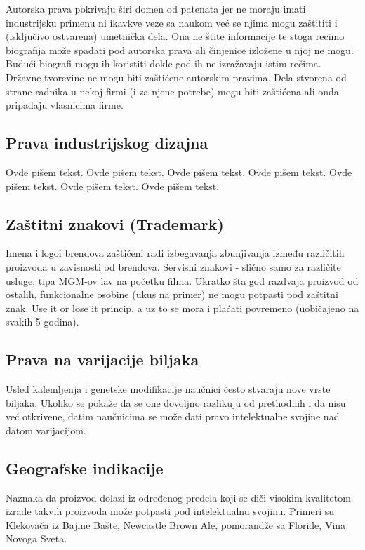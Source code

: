 \documentclass[a4paper]{article}
\begin{document}
Autorska prava pokrivaju širi domen od patenata jer ne moraju imati industrijsku primenu ni ikavkve veze sa naukom već se njima mogu zaštititi i (isključivo ostvarena) umetnička dela. Ona ne štite informacije te stoga recimo biografija može spadati pod autorska prava ali činjenice izložene u njoj ne mogu. Budući biografi mogu ih koristiti dokle god ih ne izražavaju istim rečima. Državne tvorevine ne mogu biti zaštićene autorskim pravima. Dela stvorena od strane radnika u nekoj firmi (i za njene potrebe) mogu biti zaštićena ali onda pripadaju vlasnicima firme.

\subsection{Prava industrijskog dizajna}
\label{subsec:dizajn}

Ovde pišem tekst. 
Ovde pišem tekst. 
Ovde pišem tekst. 
Ovde pišem tekst. 
Ovde pišem tekst. 
Ovde pišem tekst. 
Ovde pišem tekst. 

\subsection{Zaštitni znakovi (Trademark)}
\label{subsec:trademark}

Imena i logoi brendova zaštićeni radi izbegavanja zbunjivanja između različitih proizvoda u zavisnosti od brendova. Servisni
znakovi - slično samo za različite usluge, tipa MGM-ov lav na početku filma.
Ukratko šta god razdvaja proizvod
od ostalih, funkcionalne osobine (ukus na primer) ne mogu potpasti pod zaštitni znak. Use it or lose it princip, a uz to se mora i plaćati povremeno
(uobičajeno na svakih 5 godina).

\subsection{Prava na varijacije biljaka}
\label{subsec:granje}

Usled kalemljenja i genetske modifikacije naučnici često stvaraju nove vrste biljaka. Ukoliko se pokaže da se one dovoljno razlikuju od prethodnih i da nisu već otkrivene, datim naučnicima se može dati pravo intelektualne svojine nad datom varijacijom.

\subsection{Geografske indikacije}
\label{subsec:geo}

Naznaka da proizvod dolazi iz određenog predela koji se diči visokim kvalitetom izrade takvih proizvoda može potpasti pod intelektualnu svojinu. Primeri su Klekovača iz Bajine Bašte, Newcastle Brown Ale, pomorandže sa Floride, Vina Novoga Sveta.
\end{document}
